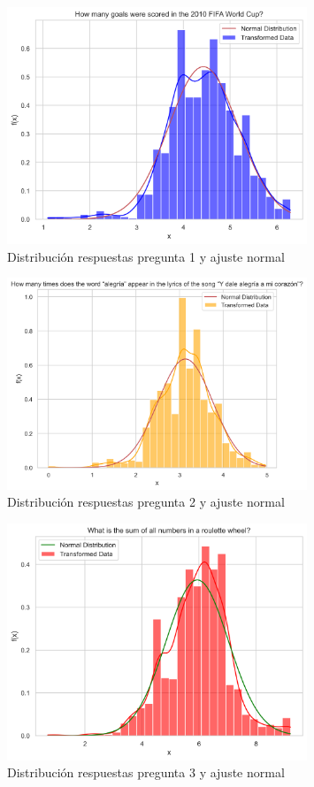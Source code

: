  \begin{figure}[h]
\centering
    \includegraphics[width=0.8\textwidth]{figures/appendix_2/goals_distribution_normal.png}
\caption{Distribución respuestas pregunta 1 y ajuste normal}
\end{figure}

\begin{figure}[h]
\centering
    \includegraphics[width=0.8\textwidth]{figures/appendix_2/alegria_distribution_normal.png}
\caption{Distribución respuestas pregunta 2 y ajuste normal}
\end{figure}

\begin{figure}[h]
\centering
    \includegraphics[width=0.8\textwidth]{figures/appendix_2/roullette_distribution_normal.png}
\caption{Distribución respuestas pregunta 3 y ajuste normal}
\end{figure}

